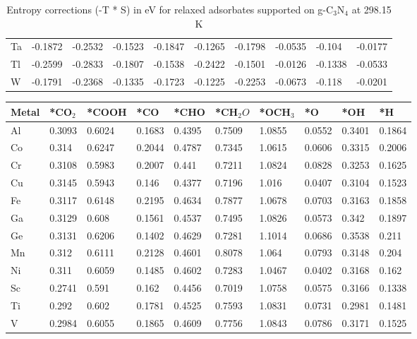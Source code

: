 \begin{table}[h]
{\begin{tabular}{*{10}{l}}
      Ta & -0.1872 & -0.2532 & -0.1523 & -0.1847 & -0.1265 & -0.1798 & -0.0535 & -0.104  & -0.0177 \\
      Tl & -0.2599 & -0.2833 & -0.1807 & -0.1538 & -0.2422 & -0.1501 & -0.0126 & -0.1338 & -0.0533 \\
      W  & -0.1791 & -0.2368 & -0.1335 & -0.1723 & -0.1225 & -0.2253 & -0.0673 & -0.118  & -0.0201 \\
      \hline
  \end{tabular}
  }
  \caption{Entropy corrections (-T * S) in eV for relaxed adsorbates supported on g-C$_3$N$_4$ at 298.15 K}
  \label{si_table8}
\end{table}


\begin{table}[h]
  \centering
  {\fontsize{6}{12}\selectfont
  \begin{tabular}{*{10}{l}}
      \hline
      Metal & *CO$_2$ & *COOH & *CO & *CHO   & *CH$_2O$ & *OCH$_3$ & *O & *OH    & *H     \\
      \hline
      Al & 0.3093 & 0.6024 & 0.1683 & 0.4395 & 0.7509 & 1.0855 & 0.0552 & 0.3401 & 0.1864 \\
      Co & 0.314  & 0.6247 & 0.2044 & 0.4787 & 0.7345 & 1.0615 & 0.0606 & 0.3315 & 0.2006 \\
      Cr & 0.3108 & 0.5983 & 0.2007 & 0.441  & 0.7211 & 1.0824 & 0.0828 & 0.3253 & 0.1625 \\
      Cu & 0.3145 & 0.5943 & 0.146  & 0.4377 & 0.7196 & 1.016  & 0.0407 & 0.3104 & 0.1523 \\
      Fe & 0.3117 & 0.6148 & 0.2195 & 0.4634 & 0.7877 & 1.0678 & 0.0703 & 0.3163 & 0.1858 \\
      Ga & 0.3129 & 0.608  & 0.1561 & 0.4537 & 0.7495 & 1.0826 & 0.0573 & 0.342  & 0.1897 \\
      Ge & 0.3131 & 0.6206 & 0.1402 & 0.4629 & 0.7281 & 1.1014 & 0.0686 & 0.3538 & 0.211  \\
      Mn & 0.312  & 0.6111 & 0.2128 & 0.4601 & 0.8078 & 1.064  & 0.0793 & 0.3148 & 0.204  \\
      Ni & 0.311  & 0.6059 & 0.1485 & 0.4602 & 0.7283 & 1.0467 & 0.0402 & 0.3168 & 0.162  \\
      Sc & 0.2741 & 0.591  & 0.162  & 0.4456 & 0.7019 & 1.0758 & 0.0575 & 0.3166 & 0.1338 \\
      Ti & 0.292  & 0.602  & 0.1781 & 0.4525 & 0.7593 & 1.0831 & 0.0731 & 0.2981 & 0.1481 \\
      V  & 0.2984 & 0.6055 & 0.1865 & 0.4609 & 0.7756 & 1.0843 & 0.0786 & 0.3171 & 0.1525 \\

\end{tabular}}
\end{table}
